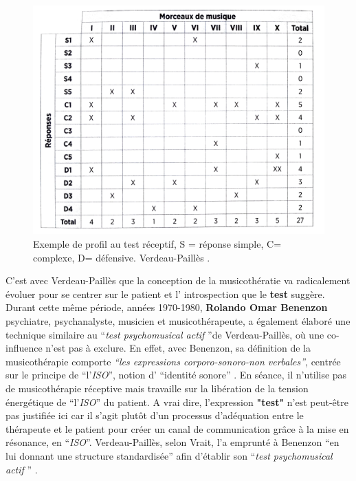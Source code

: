 \begin{center}       
	\begin{figure}
		\label{morceauxDeMusique}
		\includegraphics[width=0.6 \linewidth]{images/graphiques/verdeaupailles.png}	
		\caption[Profil test réceptif Verdeau-Paillès]{Exemple de profil au test réceptif, S = réponse 
		simple, C= complexe, D= défensive. 
		Verdeau-Paillès  \autocite[p. 89] {lecourt_les_2017}.}
	\end{figure}	
\end{center}
C'est avec Verdeau-Paillès que la conception de la musicothératie va radicalement évoluer pour se 
centrer sur le patient et l' introspection que le \textbf{test} suggère.
Durant cette même période, années 1970-1980,
\textbf{ Rolando Omar Benenzon} psychiatre, psychanalyste,
musicien et musicothérapeute, a également élaboré une technique similaire au \enquote {\textit{test 
psychomusical actif} }de Verdeau-Paillès,
 où une co-influence n'est pas à exclure.
 En effet, avec Benenzon, sa définition de la musicothérapie comporte
\emph{\textsl{ ``les expressions corporo-sonoro-non
     verbales''}}, %
centrée sur le principe de \enquote{l'\textit{ISO}}, notion
 d' \enquote{identité sonore} \autocite{benenzon:musicotherapie}.
En séance, il n'utilise pas de
 musicothérapie réceptive mais travaille sur la libération de
 la tension énergétique de \enquote{l'\textit{ISO}} du patient.
A vrai dire, l'expression \textbf{"test"} n'est peut-être pas justifiée ici car il s'agit plutôt d'un processus 
d'adéquation entre le thérapeute et le patient pour créer un canal de communication grâce à la mise en 
résonance, en \enquote{\textit{ISO}}. Verdeau-Paillès, selon Vrait, l'a emprunté à Benenzon  \enquote {en 
lui donnant une structure standardisée} afin d'établir son \enquote {\textit{test psychomusical actif} } 
\autocite[p. 39]{vrait_musicotherapie_2018}.%

